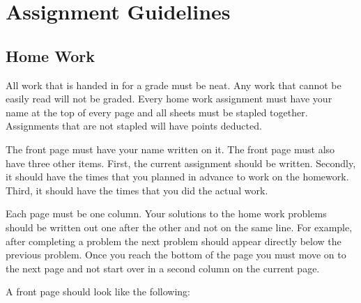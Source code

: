 \section{Assignment Guidelines}


\subsection{Home Work} 
All work that is handed in for a grade must be neat. Any work that
cannot be easily read will not be graded. Every home work assignment
must have your name at the top of every page and all sheets must be
stapled together. Assignments that are not stapled will have points
deducted.

The front page must have your name written on it. The front page must
also have three other items. First, the current assignment should be
written. Secondly, it should have the times that you planned in
advance to work on the homework. Third, it should have the times that
you did the actual work.

Each page must be one column. Your solutions to the home work problems
should be written out one after the other and not on the same line.
For example, after completing a problem the next problem should appear
directly below the previous problem. Once you reach the bottom of the
page you must move on to the next page and not start over in a second
column on the current page.

A front page should look like the following: \\
\begin{center}
\end{center}

